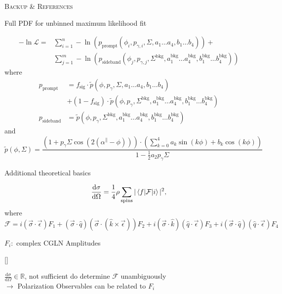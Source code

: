 \documentclass[11pt,aspectratio=169,dvipsnames]{beamer}
\newcommand{\thecolor}{black!70!blue}
\begin{document}
	\appendix
	\begin{frame}
		\centering
		\LARGE
		\color{\thecolor}\textsc{Backup \& References}
	\end{frame}
	\begin{frame}{Full PDF for unbinned maximum likelihood fit}
		
		\begin{align*}
			-\ln\mathcal{L}=&\sum_{i=1}^{n}-\ln(p_\text{prompt}(\phi_i,p_{\gamma,i},\Sigma,a_1\dots a_4,b_1\dots b_4))+\\
			&\sum_{j=1}^{m}-\ln\left(p_\text{sideband}(\phi_j,p_{\gamma,j},\Sigma^\text{bkg},a_1^\text{bkg}\dots a_4^\text{bkg},b_1^\text{bkg}\dots b_4^\text{bkg})\right)
		\end{align*}
		where
		\begin{align*}
			p_\text{prompt}&=f_{\text{sig}}\cdot\tilde{p}(\phi,p_\gamma,\Sigma,a_1\dots a_4, b_1\dots b_4)\\ &+ \left(1-f_\text{sig}\right)\cdot\tilde{p}(\phi,p_\gamma,\Sigma^\text{bkg},a_1^\text{bkg}\dots a_4^\text{bkg}, b_1^\text{bkg}\dots b_4^\text{bkg})\\
			p_\text{sideband}&=\tilde{p}(\phi,p_\gamma,\Sigma^\text{bkg},a_1^\text{bkg}\dots a_4^\text{bkg}, b_1^\text{bkg}\dots b_4^\text{bkg})
		\end{align*}
		and \begin{equation*}
			\tilde{p}(\phi,\Sigma)=\frac{\left(1+p_\gamma\Sigma\cos\left(2\left(\alpha^\parallel-\phi\right)\right)\right)\cdot\left(\sum_{k=0}^{4}a_k\sin(k\phi)+b_k\cos(k\phi)\right)}{1-\frac{1}{2}a_2p_\gamma\Sigma}
		\end{equation*}
		
	\end{frame}
	\begin{frame}{Additional theoretical basics}
		\begin{tcolorbox}[colback=blue!5,colframe=\thecolor,title=Unpolarized differential cross section]
			
			$$\frac{\text{d}\sigma}{\text{d}\Omega}=\frac{1}{4}\rho\sum_{\text{spins}}|\braket{f|\mathcal{F}|i}|^2\\,$$
			where
			$$\mathcal{F}=i(\vec{\sigma}\cdot\vec{\epsilon})F_1+(\vec{\sigma}\cdot\hat{q})(\vec{\sigma}\cdot(\hat{k}\times\vec{\epsilon}))F_2+i(\vec{\sigma}\cdot\hat{k})(\hat{q}\cdot\vec{\epsilon})F_3+i(\vec{\sigma}\cdot\hat{q})(\hat{q}\cdot\vec{\epsilon})F_4$$
			\begin{flushright}
				$F_i:$ complex CGLN Amplitudes
			\end{flushright}
			
			
			\begin{flushright}
				{\scriptsize[\cite{cgln}]}
			\end{flushright}
		\end{tcolorbox}
		$\frac{\text{d}\sigma}{\text{d}\Omega}\in\mathbb{R}$, not sufficient do determine $\mathcal{F}$ unambiguously\\
		$\rightarrow$ Polarization Observables can be related to $F_i$
	\end{frame}
\end{document}
